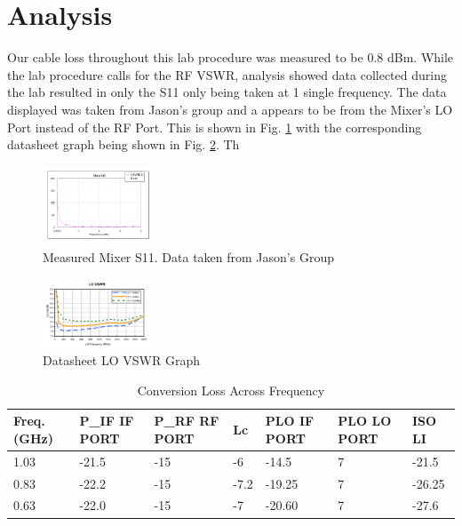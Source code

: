 \documentclass[journal]{IEEEtran}
\begin{document}
\section{Analysis}

Our cable loss throughout this lab procedure was measured to be 0.8 dBm. While
the lab procedure calls for the RF VSWR, analysis showed data collected during
the lab resulted in only the S11 only being taken at 1 single frequency. The
data displayed was taken from Jason's group and a appears to be from the Mixer's
LO Port instead of the RF Port. This is shown in Fig. \ref{fig:mixer_lo_vswr} with
the corresponding datasheet graph being shown in Fig. \ref{fig:mixer_lo_vswr_ds}. Th


\begin{figure}[hp]
    \centering
    \includegraphics[width=0.3\textwidth]{mixer_lo_vswr.png}
    \caption{\label{fig:mixer_lo_vswr} Measured Mixer S11. Data taken from Jason's Group}
\end{figure}

\begin{figure}[hp]
    \centering
    \includegraphics[width=0.3\textwidth]{mixer_lo_vswr_ds.png}
    \caption{\label{fig:mixer_lo_vswr_ds} Datasheet LO VSWR Graph }
\end{figure}

\begin{table}[]
    \centering
    \begin{tabularx}{0.5\textwidth}{XXXXXXX}
        \toprule
        Freq. (GHz) & P\_IF IF PORT & P\_RF RF PORT & Lc   & PLO IF PORT & PLO LO PORT & ISO LI \\ \midrule
        1.03        & -21.5         & -15           & -6   & -14.5       & 7           & -21.5  \\ \midrule
        0.83        & -22.2         & -15           & -7.2 & -19.25      & 7           & -26.25 \\ \midrule
        0.63        & -22.0         & -15           & -7   & -20.60      & 7           & -27.6  \\ \bottomrule
    \end{tabularx}
    \vspace{1em}
    \caption{\label{tab:conv_loss} Conversion Loss Across Frequency}

\end{table}
\end{document}
